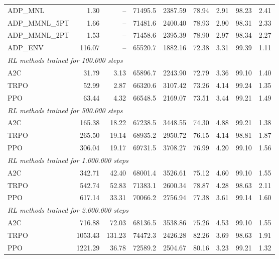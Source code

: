 \begin{samepage}
\begin{center}
\begin{tabular}{l|rr|rr|rr|rr}
    \midrule
    ADP\_MNL     &     1.30 &    -- &    71495.5 &    2387.59 &   78.94 &    2.91 &   98.23 &    2.41 \\
    ADP\_MMNL\_5PT &     1.66 &    -- &    71481.6 &    2400.40 &   78.93 &    2.90 &   98.31 &    2.33 \\
    ADP\_MMNL\_2PT &     1.53 &    -- &    71458.6 &    2395.39 &   78.90 &    2.97 &   98.34 &    2.27 \\
    ADP\_ENV     &   116.07 &    -- &    65520.7 &    1882.16 &   72.38 &    3.31 &   99.39 &    1.11 \\
    \midrule
    \multicolumn{9}{l}{\textit{RL methods trained for 100.000 steps}} \\
    \midrule
    A2C          &    31.79 &     3.13 &    65896.7 &    2243.90 &   72.79 &    3.36 &   99.10 &    1.40 \\
    TRPO         &    52.99 &     2.87 &    66320.6 &    3107.42 &   73.26 &    4.14 &   99.24 &    1.35 \\
    PPO          &    63.44 &     4.32 &    66548.5 &    2169.07 &   73.51 &    3.44 &   99.21 &    1.49 \\
    \midrule
    \multicolumn{9}{l}{\textit{RL methods trained for 500.000 steps}} \\
    \midrule
    A2C          &   165.38 &    18.22 &    67238.5 &    3448.55 &   74.30 &    4.88 &   99.21 &    1.38 \\
    TRPO         &   265.50 &    19.14 &    68935.2 &    2950.72 &   76.15 &    4.14 &   98.81 &    1.87 \\
    PPO          &   306.04 &    19.17 &    69731.5 &    3708.27 &   76.99 &    4.20 &   99.10 &    1.56 \\
    \midrule
    \multicolumn{9}{l}{\textit{RL methods trained for 1.000.000 steps}} \\
    \midrule
    A2C          &   342.71 &    42.40 &    68001.4 &    3526.61 &   75.12 &    4.60 &   99.10 &    1.55 \\
    TRPO         &   542.74 &    52.83 &    71383.1 &    2600.34 &   78.87 &    4.28 &   98.63 &    2.11 \\
    PPO          &   617.14 &    33.31 &    70066.2 &    2756.94 &   77.38 &    3.61 &   99.14 &    1.60 \\
    \midrule
    \multicolumn{9}{l}{\textit{RL methods trained for 2.000.000 steps}} \\
    \midrule
    A2C          &   716.88 &    72.03 &    68136.5 &    3538.86 &   75.26 &    4.53 &   99.10 &    1.55 \\
    TRPO         &  1053.43 &   131.23 &    74472.3 &    2426.28 &   82.26 &    3.69 &   98.63 &    1.91 \\
    PPO          &  1221.29 &    36.78 &    72589.2 &    2504.67 &   80.16 &    3.23 &   99.21 &    1.32 \\
    \bottomrule
  \end{tabular}
\end{center}
\end{samepage}

